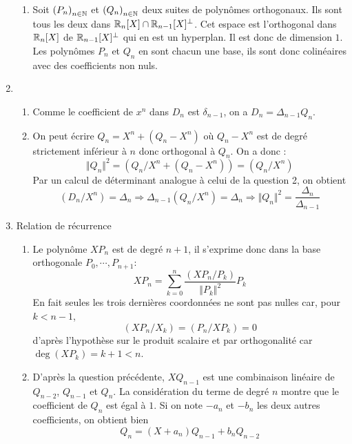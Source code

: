 \begin{enumerate}
\begin{enumerate}
 \item Soit $\left( P_n\right) _{n\in \mathbb{N}}$ et $\left(Q_n\right) _{n\in \mathbb{N}}$ deux suites de polynômes orthogonaux. Ils sont tous les deux dans $\mathbb{R}_n[X]\cap \mathbb{R}_{n-1}[X]^\perp$. Cet espace est l'orthogonal dans $\mathbb{R}_n[X]$ de $\mathbb{R}_{n-1}[X]^\perp$ qui en est un hyperplan. Il est donc de dimension $1$. Les polynômes $P_n$ et $Q_n$ en sont chacun une base, ils sont donc colinéaires avec des coefficients non nuls.
\end{enumerate}
\item 
\begin{enumerate}
 \item Comme le coefficient de $x^n$ dans $D_n$ est $\delta_{n-1}$, on a $D_n=\Delta_{n-1}Q_n$.
 \item On peut écrire $Q_n=X^n +(Q_n-X^n)$ où $Q_n-X^n$ est de degré strictement inférieur à $n$ donc orthogonal à $Q_n$. On a donc :
\begin{displaymath}
 \Vert Q_n\Vert^2 = (Q_n/X^n+(Q_n-X^n))=(Q_n/X^n)
\end{displaymath}
Par un calcul de déterminant analogue à celui de la question 2, on obtient
\begin{displaymath}
 (D_n/X^n)=\Delta_n\Rightarrow \Delta_{n-1}(Q_n/X^n)=\Delta_n\Rightarrow 
\Vert Q_n\Vert^2 = \frac{\Delta_{n}}{\Delta_{n-1}}
\end{displaymath}
\end{enumerate}
\item Relation de récurrence
\begin{enumerate}
 \item Le polynôme $XP_n$ est de degré $n+1$, il s'exprime donc dans la base orthogonale $P_0,\cdots,P_{n+1}$:
\begin{displaymath}
 XP_n = \sum_{k=0}^n\frac{(XP_n/P_k)}{\Vert P_k\Vert^2}P_k
\end{displaymath}
En fait seules les trois dernières coordonnées ne sont pas nulles car, pour $k<n-1$,
\begin{displaymath}
 (XP_n/X_k)=(P_n/XP_k)= 0
\end{displaymath}
 d'après l'hypothèse sur le produit scalaire et par orthogonalité car $\deg(XP_k)=k+1<n$.
 \item D'après la question précédente, $XQ_{n-1}$ est une combinaison linéaire de $Q_{n-2}$, $Q_{n-1}$ et $Q_{n}$. La considération du terme de degré $n$ montre que le coefficient de $Q_n$ est égal à $1$. Si on note $-a_n$ et $-b_n$ les deux autres coefficients, on obtient bien
\begin{displaymath}
 Q_{n}=(X+a_n)Q_{n-1}+b_nQ_{n-2}
\end{displaymath}

\end{enumerate}
\end{enumerate}
